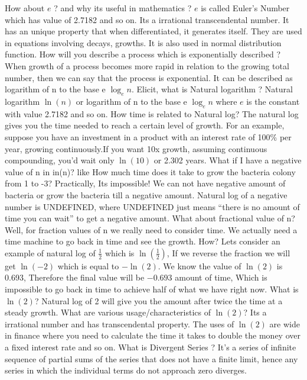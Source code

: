 \documentclass{article}
\begin{document}
\begin{description}
\me How about $e$ ? and why its useful in mathematics ?
\prof $e$ is called Euler’s Number which has value of 2.7182 and so on. Its a irrational transcendental number. It has an unique property that when differentiated, it generates itself. They are used in equations involving decays, growths. It is also used in normal distribution function.
\me  How will you describe a process which is exponentially described ?
\prof  When growth of a process becomes more rapid in relation to the growing total number, then we can say that the process is exponential. It can be described as logarithm of n to the base e $\log_e{n}$.
\me Elicit, what is Natural logarithm ?
\prof Natural logarithm $\ln(n)$ or logarithm of n to the base e $\log_e{n}$ where $e$ is the constant with value 2.7182 and so on.
\me How time is related to Natural log?
\prof The natural log gives you the time needed to reach a certain level of growth. For an example, suppose you have an investment in a product with an interest rate of 100\% per year, growing continuously.If you want 10x growth, assuming continuous compounding, you’d wait only $\ln(10)$ or 2.302 years.
\me What if I have a negative value of n in in(n)? like How much time does it take to grow the bacteria colony from 1 to -3?
\prof Practically, Its impossible! We can not have negative amount of bacteria or grow the bacteria till a negative amount. Natural log of a negative number is UNDEFINED, where UNDEFINED just means “there is no amount of time you can wait” to get a negative amount.
\me What about fractional value of n?
\prof Well, for fraction values of n we really need to consider time. We actually need a time machine to go back in time and see the growth.
\me How?
\prof Lets consider an example of natural log of $\frac{1}{2}$ which is $\ln(\frac{1}{2})$, If we reverse the fraction we will get $\ln(-2)$ which is equal to $-\ln(2)$. We know the value of $\ln(2)$ is 0.693, Therefore the final value will be $-0.693$ amount of time, Which is impossible to go back in time to achieve half of what we have right now.
\me What is $\ln(2)$?
\prof Natural log of 2 will give you the amount after twice the time at a steady growth.
\me What are various usage/characteristics of $\ln(2)$?
\prof Its a irrational number and has transcendental property. The uses of $\ln(2)$ are wide in finance where you need to calculate the time it takes to double the money over a fixed interest rate and so on.
\me What is Divergent Series ?
\prof It's a series of infinite sequence of partial sums of the series that does not have a finite limit, hence any series in which the individual terms do not approach zero diverges.

\end{description}
\end{document}
